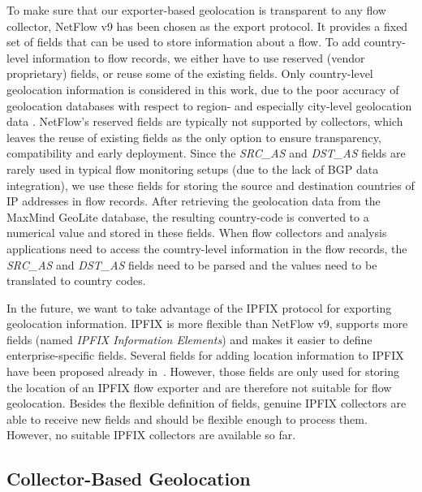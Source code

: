 To make sure that our exporter-based geolocation is transparent to any flow collector, NetFlow v9 has been chosen as the export protocol. It provides a fixed set of fields that can be used to store information about a flow. To add country-level information to flow records, we either have to use reserved (vendor proprietary) fields, or reuse some of the existing fields. Only country-level geolocation information is considered in this work, due to the poor accuracy of geolocation databases with respect to region- and especially city-level geolocation data \cite{Poese-2011-IP}. NetFlow's reserved fields are typically not supported by collectors, which leaves the reuse of existing fields as the only option to ensure transparency, compatibility and early deployment. Since the \textit{SRC\_AS} and \textit{DST\_AS} fields are rarely used in typical flow monitoring setups (due to the lack of BGP data integration), we use these fields for storing the source and destination countries of IP addresses in flow records. After retrieving the geolocation data from the MaxMind GeoLite database, the resulting country-code is converted to a numerical value and stored in these fields. When flow collectors and analysis applications need to access the country-level information in the flow records, the \textit{SRC\_AS} and \textit{DST\_AS} fields need to be parsed and the values need to be translated to country codes.

In the future, we want to take advantage of the IPFIX protocol for exporting geolocation information. IPFIX is more flexible than NetFlow v9, supports more fields (named \textit{IPFIX Information Elements}) and makes it easier to define enterprise-specific fields. Several fields for adding location information to IPFIX have been proposed already in~\cite{draft-irtf-nmrg-location-ipfix-00}. However, those fields are only used for storing the location of an IPFIX flow exporter and are therefore not suitable for flow geolocation. Besides the flexible definition of fields, genuine IPFIX collectors are able to receive new fields and should be flexible enough to process them. However, no suitable IPFIX collectors are available so far.

\subsection{Collector-Based Geolocation} \label{subsec:geo-collector_based_geolocation}

